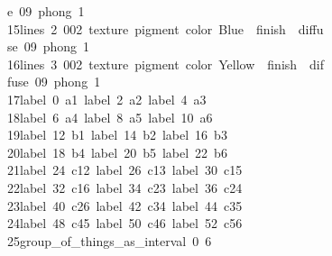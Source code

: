 \begin{tabbing}
\>e\ 09\ phong\ 1\ \\[0pt]
15\>\>\>\>lines\ 2\ 002\ texture\ pigment\ color\ Blue\ \ finish\ \ diffu\\[0pt]
\>se\ 09\ phong\ 1\ \\[0pt]
16\>\>\>\>lines\ 3\ 002\ texture\ pigment\ color\ Yellow\ \ finish\ \ dif\\[0pt]
\>fuse\ 09\ phong\ 1\ \\[0pt]
17\>\>\>\>label\ 0\ a1\ label\ 2\ a2\ label\ 4\ a3\ \\[0pt]
18\>\>\>\>label\ 6\ a4\ label\ 8\ a5\ label\ 10\ a6\ \\[0pt]
19\>\>\>\>label\ 12\ b1\ label\ 14\ b2\ label\ 16\ b3\ \\[0pt]
20\>\>\>\>label\ 18\ b4\ label\ 20\ b5\ label\ 22\ b6\ \\[0pt]
21\>\>\>\>label\ 24\ c12\ label\ 26\ c13\ label\ 30\ c15\ \\[0pt]
22\>\>\>\>label\ 32\ c16\ label\ 34\ c23\ label\ 36\ c24\ \\[0pt]
23\>\>\>\>label\ 40\ c26\ label\ 42\ c34\ label\ 44\ c35\ \\[0pt]
24\>\>\>\>label\ 48\ c45\ label\ 50\ c46\ label\ 52\ c56\ \\[0pt]
25\>\>\>\>group\_of\_things\_as\_interval\ 0\ 6\ \\[0pt]

\end{tabbing}

